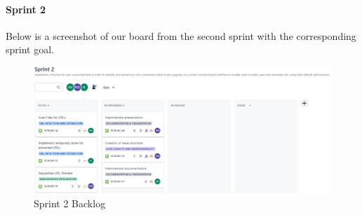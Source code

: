 \paragraph{Sprint 2}
Below is a screenshot of our board from the second sprint with the corresponding sprint goal.
\begin{figure}[h!]
    \centering
    \includegraphics[width=1\textwidth]{pictures/Scrum/Sprint 2/Sprint2_Backlog}
    \caption{Sprint 2 Backlog}
    \label{fig:sprint_2_backlog}
\end{figure}


